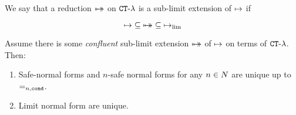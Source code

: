 We say that a reduction ${\mapsto\!\!\!\!\! \mapsto}$ on ${ {\tt CT} \mbox{-} \lambda}$ 
is a sub-limit extension of $\mathbin{\mapsto}$ if

$$
\mathbin{\mapsto} \subseteq {\mapsto\!\!\!\!\! \mapsto} \subseteq \mathbin{\mapsto}_{\lim}
$$ 

\begin{lemma}
Assume there is some \emph{confluent} sub-limit extension ${\mapsto\!\!\!\!\! \mapsto}$
of $\mathbin{\mapsto}$ on terms of ${ {\tt CT} \mbox{-} \lambda}$.
Then: 
\begin{enumerate}
\item
Safe-normal forms and $n$-safe normal forms for any $n \in {N}$ are unique up to $=_{n,{\tt cond}}$.
\item
Limit normal form are unique.
\end{enumerate}
\end{lemma}

